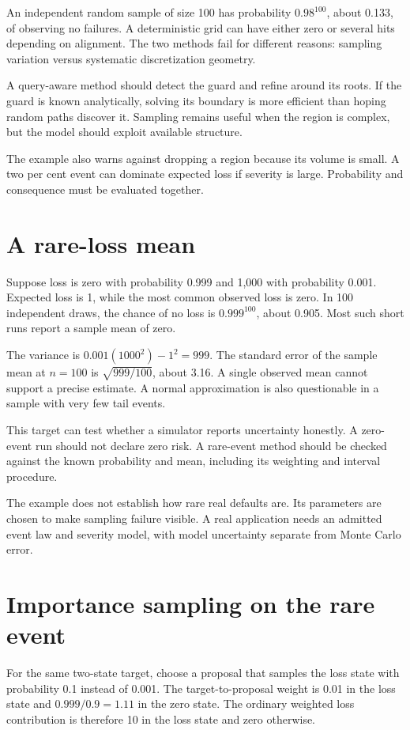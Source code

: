 An independent random sample of size 100 has probability $0.98^{100}$, about 0.133, of observing no failures. A deterministic grid can have either zero or several hits depending on alignment. The two methods fail for different reasons: sampling variation versus systematic discretization geometry.

A query-aware method should detect the guard and refine around its roots. If the guard is known analytically, solving its boundary is more efficient than hoping random paths discover it. Sampling remains useful when the region is complex, but the model should exploit available structure.

The example also warns against dropping a region because its volume is small. A two per cent event can dominate expected loss if severity is large. Probability and consequence must be evaluated together.

\section{A rare-loss mean}
Suppose loss is zero with probability 0.999 and 1,000 with probability 0.001. Expected loss is 1, while the most common observed loss is zero. In 100 independent draws, the chance of no loss is $0.999^{100}$, about 0.905. Most such short runs report a sample mean of zero.

The variance is $0.001(1000^2)-1^2=999$. The standard error of the sample mean at $n=100$ is $\sqrt{999/100}$, about 3.16. A single observed mean cannot support a precise estimate. A normal approximation is also questionable in a sample with very few tail events.

This target can test whether a simulator reports uncertainty honestly. A zero-event run should not declare zero risk. A rare-event method should be checked against the known probability and mean, including its weighting and interval procedure.

The example does not establish how rare real defaults are. Its parameters are chosen to make sampling failure visible. A real application needs an admitted event law and severity model, with model uncertainty separate from Monte Carlo error.

\section{Importance sampling on the rare event}
For the same two-state target, choose a proposal that samples the loss state with probability 0.1 instead of 0.001. The target-to-proposal weight is 0.01 in the loss state and $0.999/0.9=1.11$ in the zero state. The ordinary weighted loss contribution is therefore 10 in the loss state and zero otherwise.


